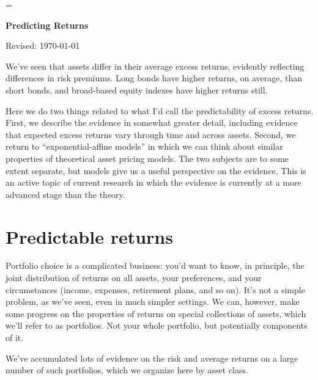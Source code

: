 \documentclass[11pt]{article}
\begin{document}
\parskip=\bigskipamount
\parindent=0.0in
\thispagestyle{empty}


\bigskip\bigskip
\centerline{\Large \bf Predicting Returns}
\centerline{Revised: \today}

\bigskip
We've seen that assets differ in their average excess returns,
evidently reflecting differences in risk premiums.
Long bonds have higher returns, on average, than short bonds,
and broad-based equity indexes have higher returns still.

Here we do two things related to what I'd call the predictability of
excess returns.  First, we describe the evidence in somewhat greater detail,
including evidence that expected excess returns vary through time and across assets.
Second, we return to ``exponential-affine models'' in which we can think
about similar properties of theoretical asset pricing models.
The two subjects are to some extent separate,
but models give us a useful perspective on the evidence.
This is an active topic of current research in which
the evidence is currently at a more advanced stage than the theory.


\section{Predictable returns}

Portfolio choice is a complicated business:  you'd want to know,
in principle, the joint distribution of returns on all assets,
your preferences, and your circumstances (income, expenses, retirement plans, and so on).
It's not a simple problem, as we've seen, even in much simpler settings.
We can, however, make some progress on the properties of returns
on special collections of assets, which we'll refer to as portfolios.
Not your whole portfolio, but potentially components of it.

We've accumulated lots of evidence on the risk and average returns
on a large number of such portfolios, which we organize here by asset class.
\end{document}
